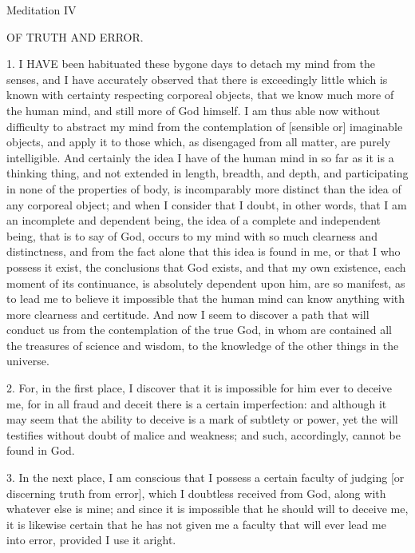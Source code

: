 Meditation IV


OF TRUTH AND ERROR.

1. I HAVE been habituated these bygone days to detach my mind from the senses, and I have accurately observed that there is exceedingly little which is known with certainty respecting corporeal objects, that we know much more of the human mind, and still more of God himself. I am thus able now without difficulty to abstract my mind from the contemplation of [sensible or] imaginable objects, and apply it to those which, as disengaged from all matter, are purely intelligible. And certainly the idea I have of the human mind in so far as it is a thinking thing, and not extended in length, breadth, and depth, and participating in none of the properties of body, is incomparably more distinct than the idea of any corporeal object; and when I consider that I doubt, in other words, that I am an incomplete and dependent being, the idea of a complete and independent being, that is to say of God, occurs to my mind with so much clearness and distinctness, and from the fact alone that this idea is found in me, or that I who possess it exist, the conclusions that God exists, and that my own existence, each moment of its continuance, is absolutely dependent upon him, are so manifest, as to lead me to believe it impossible that the human mind can know anything with more clearness and certitude. And now I seem to discover a path that will conduct us from the contemplation of the true God, in whom are contained all the treasures of science and wisdom, to the knowledge of the other things in the universe.

2. For, in the first place, I discover that it is impossible for him ever to deceive me, for in all fraud and deceit there is a certain imperfection: and although it may seem that the ability to deceive is a mark of subtlety or power, yet the will testifies without doubt of malice and weakness; and such, accordingly, cannot be found in God.

3. In the next place, I am conscious that I possess a certain faculty of judging [or discerning truth from error], which I doubtless received from God, along with whatever else is mine; and since it is impossible that he should will to deceive me, it is likewise certain that he has not given me a faculty that will ever lead me into error, provided I use it aright.


